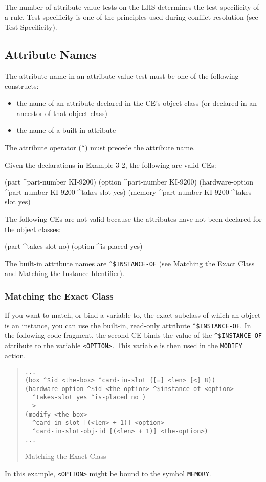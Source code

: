 The number of attribute-value tests on the LHS determines the test
specificity of a rule. Test specificity is one of the principles used
during conflict resolution (see Test Specificity).

\subsection{Attribute Names}

The attribute name in an attribute-value test must be one
of the following constructs:
\begin{itemize}
\item the name of an attribute declared in the CE's object class (or
  declared in an ancestor of that object class)
\item the name of a built-in attribute
\end{itemize}
The attribute operator (\verb|^|) must precede the attribute name.

Given the declarations in Example 3-2, the following are valid CEs:
\begin{qv}
(part ^part-number KI-9200)
(option ^part-number KI-9200)
(hardware-option ^part-number KI-9200 ^takes-slot yes)
(memory ^part-number KI-9200 ^takes-slot yes)
\end{qv}

The following CEs are not valid because the attributes
have not been declared for the object classes:
\begin{qv}
(part ^takes-slot no)
(option ^is-placed yes)
\end{qv}

The built-in attribute names are \verb|^$INSTANCE-OF| (see
Matching the Exact Class and Matching the Instance
Identifier).

\subsubsection*{Matching the Exact Class}

If you want to match, or bind a variable to, the exact subclass of
which an object is an instance, you can use the built-in, read-only
attribute
\verb|^$INSTANCE-OF|. In the following code fragment, the second CE
binds the value of the \verb|^$INSTANCE-OF| attribute to the variable
\verb|<OPTION>|. This variable is then used in the \verb|MODIFY|
action.

\begin{example}[h]
\begin{quote}
\begin{verbatim}
...
(box ^$id <the-box> ^card-in-slot {[=] <len> [<] 8})
(hardware-option ^$id <the-option> ^$instance-of <option>
  ^takes-slot yes ^is-placed no )
-->
(modify <the-box>
  ^card-in-slot [(<len> + 1)] <option>
  ^card-in-slot-obj-id [(<len> + 1)] <the-option>)
...
\end{verbatim}
\caption{Matching the Exact Class}
\label{e:3-4}
\end{quote}
In this example, \verb|<OPTION>| might be bound to the symbol
\verb|MEMORY|.
\end{example}

